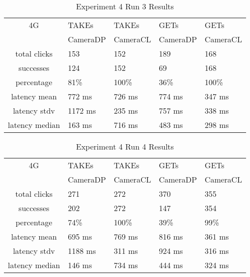 \begin{table}[htb]
\begin{scriptsize} 
\caption{Experiment 4 Run 3 Results} 
\label{table:exp-4-run3-results}
 \begin{center}
 \begin{tabular}{| c | p{1.5cm} | p{1.5cm} | p{1.5cm} | p{1.4cm} |}
  \hline
  4G & TAKEs & TAKEs & GETs & GETs \\
  & CameraDP & CameraCL & CameraDP & CameraCL \\
  \hline
  total clicks & 153 & 152 & 189 & 168 \\
  \hline
  successes & 124 & 152 & 69 & 168 \\
  \hline
  percentage & 81\% & 100\% & 36\% & 100\% \\
  \hline
  latency mean & 772 ms & 726 ms & 774 ms & 347 ms \\
  \hline
  latency stdv & 1172 ms & 235 ms & 757 ms & 338 ms \\
  \hline
  latency median & 163 ms & 716 ms & 483 ms & 298 ms \\
  \hline
  \end{tabular}
  \end{center}
\end{scriptsize}
\end{table}

\begin{table}[htb]
\begin{scriptsize} 
\caption{Experiment 4 Run 4 Results} 
\label{table:exp-4-run4-results}
 \begin{center}
 \begin{tabular}{| c | p{1.5cm} | p{1.5cm} | p{1.5cm} | p{1.4cm} |}
  \hline
  4G & TAKEs & TAKEs & GETs & GETs \\
  & CameraDP & CameraCL & CameraDP & CameraCL \\
  \hline
  total clicks & 271 & 272 & 370 & 355 \\
  \hline
  successes & 202 & 272 & 147 & 354 \\
  \hline
  percentage & 74\% & 100\% & 39\% & 99\% \\
  \hline
  latency mean & 695 ms & 769 ms & 816 ms & 361 ms \\
  \hline
  latency stdv & 1188 ms & 311 ms & 924 ms & 316 ms \\
  \hline
  latency median & 146 ms & 734 ms & 444 ms & 324 ms \\
  \hline
  \end{tabular}
  \end{center}
\end{scriptsize}
\end{table}

